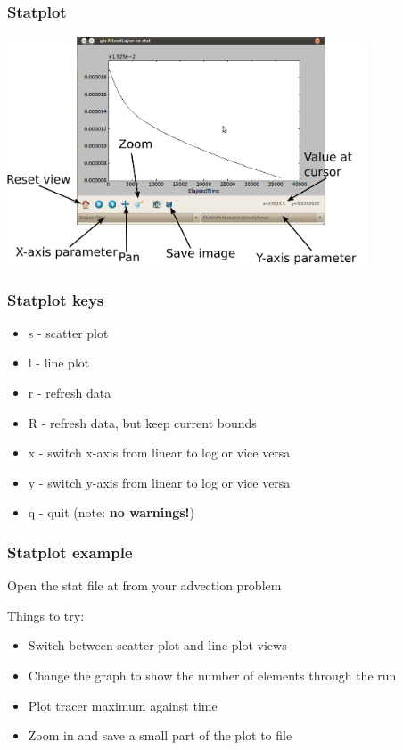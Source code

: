 \documentclass[12pt]{beamer}
\begin{document}
\begin{frame}
    \frametitle{Statplot}
\begin{center}
\includegraphics[width=0.8\textwidth]{images/statplot_labelled.png}
\end{center}
\end{frame}

\begin{frame}
    \frametitle{Statplot keys}
\begin{itemize}
\item s - scatter plot
\item l - line plot
\item r - refresh data
\item R - refresh data, but keep current bounds
\item x - switch x-axis from linear to log or vice versa
\item y - switch y-axis from linear to log or vice versa
\item q - quit (note: \textbf{no warnings!})
\end{itemize}
\end{frame}

\begin{frame}
    \frametitle{Statplot example}
Open the stat file at from your advection problem

Things to try:
\begin{itemize}
\item Switch between scatter plot and line plot views
\item Change the graph to show the number of elements through the run
\item Plot tracer maximum against time
\item Zoom in and save a small part of the plot to file
\end{itemize}
\end{frame}
\end{document}

